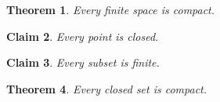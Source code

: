 \documentclass{article}
\newtheorem{theorem}{Theorem}
\newtheorem{claim}[theorem]{Claim}
\begin{document}
\begin{theorem} Every finite space is compact. \end{theorem}
\begin{claim} Every point is closed. \end{claim}
\begin{claim} Every subset is finite. \end{claim}
\begin{theorem} Every closed set is compact. \end{theorem}
\end{document}
